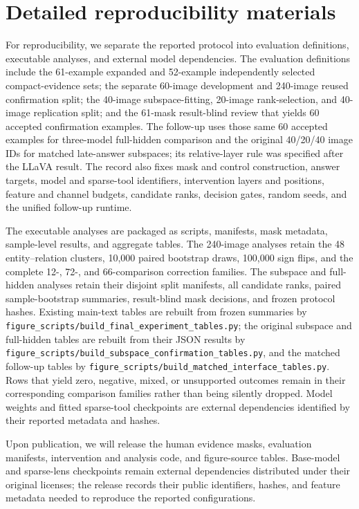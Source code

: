 \section{Detailed reproducibility materials}
\label{app:reproducibility-details}

For reproducibility, we separate the reported protocol into evaluation definitions, executable analyses, and external model dependencies. The evaluation definitions include the 61-example expanded and 52-example independently selected compact-evidence sets; the separate 60-image development and 240-image reused confirmation split; the 40-image subspace-fitting, 20-image rank-selection, and 40-image replication split; and the 61-mask result-blind review that yields 60 accepted confirmation examples. The follow-up uses those same 60 accepted examples for three-model full-hidden comparison and the original 40/20/40 image IDs for matched late-answer subspaces; its relative-layer rule was specified after the LLaVA result. The record also fixes mask and control construction, answer targets, model and sparse-tool identifiers, intervention layers and positions, feature and channel budgets, candidate ranks, decision gates, random seeds, and the unified follow-up runtime.

The executable analyses are packaged as scripts, manifests, mask metadata, sample-level results, and aggregate tables. The 240-image analyses retain the 48 entity--relation clusters, 10,000 paired bootstrap draws, 100,000 sign flips, and the complete 12-, 72-, and 66-comparison correction families. The subspace and full-hidden analyses retain their disjoint split manifests, all candidate ranks, paired sample-bootstrap summaries, result-blind mask decisions, and frozen protocol hashes. Existing main-text tables are rebuilt from frozen summaries by \texttt{figure\_scripts/build\_final\_experiment\_tables.py}; the original subspace and full-hidden tables are rebuilt from their JSON results by \texttt{figure\_scripts/build\_subspace\_confirmation\_tables.py}, and the matched follow-up tables by \texttt{figure\_scripts/build\_matched\_interface\_tables.py}. Rows that yield zero, negative, mixed, or unsupported outcomes remain in their corresponding comparison families rather than being silently dropped. Model weights and fitted sparse-tool checkpoints are external dependencies identified by their reported metadata and hashes.

Upon publication, we will release the human evidence masks, evaluation manifests, intervention and analysis code, and figure-source tables. Base-model and sparse-lens checkpoints remain external dependencies distributed under their original licenses; the release records their public identifiers, hashes, and feature metadata needed to reproduce the reported configurations.
